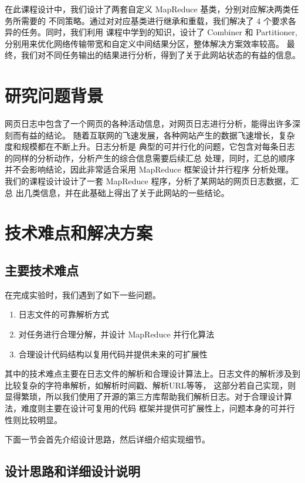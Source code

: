 \documentclass{article}
\begin{document}
  在此课程设计中，我们设计了两套自定义 MapReduce 基类，分别对应解决两类任务所需要的
  不同策略。通过对对应基类进行继承和重载，我们解决了 4 个要求各异的任务。同时，我们利用
  课程中学到的知识，设计了 Combiner 和 Partitioner, 分别用来优化网络传输带宽和自定义中间结果分区，整体解决方案效率较高。
  最终，我们对不同任务输出的结果进行分析，得到了关于此网站状态的有益的信息。

  \section{研究问题背景}
  
  网页日志中包含了一个网页的各种活动信息，对网页日志进行分析，能得出许多深刻而有益的结论。
  随着互联网的飞速发展，各种网站产生的数据飞速增长，复杂度和规模都在不断上升。日志分析是
  典型的可并行化的问题，它包含对每条日志的同样的分析动作，分析产生的综合信息需要后续汇总
  处理，同时，汇总的顺序并不会影响结论，因此非常适合采用 MapReduce 框架设计并行程序
  分析处理。我们的课程设计设计了一套 MapReduce 程序，分析了某网站的网页日志数据，汇总
  出几类信息，并在此基础上得出了关于此网站的一些结论。

  \section{技术难点和解决方案}
  \subsection{主要技术难点}
  在完成实验时，我们遇到了如下一些问题。
  \begin{enumerate}
    \item 日志文件的可靠解析方式
    \item 对任务进行合理分解，并设计 MapReduce 并行化算法
    \item 合理设计代码结构以复用代码并提供未来的可扩展性
  \end{enumerate}
  
  其中的技术难点主要在日志文件的解析和合理设计算法上。日志文件的解析涉及到比较复杂的字符串解析，如解析时间戳、解析URL等等，
  这部分若自己实现，则显得繁琐，所以我们使用了开源的第三方库帮助我们解析日志。对于合理设计算法，难度则主要在设计可复用的代码
  框架并提供可扩展性上，问题本身的可并行性则比较明显。

  下面一节会首先介绍设计思路，然后详细介绍实现细节。
  \subsection{设计思路和详细设计说明}
\end{document}
